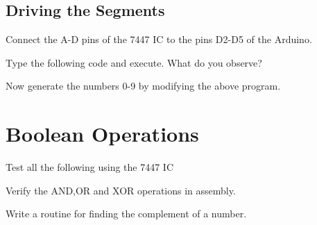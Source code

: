 \subsection{Driving the Segments}
\begin{problem}
Connect the A-D pins of the 7447 IC to the pins D2-D5 of the Arduino.
\end{problem}	
\begin{problem}
Type the following code and execute. What do you observe? 

%
\end{problem}
%
\begin{problem}
Now generate the numbers 0-9 by modifying the above program.
\end{problem}
%

\section{Boolean Operations}
%
Test all the following using the 7447 IC
\begin{problem}
Verify the AND,OR and XOR operations in assembly.
\end{problem}
\solution

\begin{problem}
\label{prob:ch2_complement}
Write a routine for finding the complement of a number.
\end{problem}
\solution

%
%
%
%

